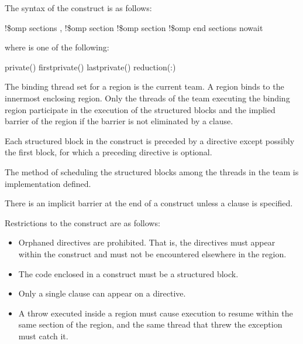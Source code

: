 \begin{samepage}
\fortranspecificstart
The syntax of the  construct is as follows:

\begin{boxedcode}
!\$omp sections \plc{[clause[ [},\plc{] clause] ... ]}
   \plc{[}!\$omp section\plc{]}
   \plc{[}!\$omp section
      \plc{structured-block]}
!\$omp end sections \plc{[}nowait\plc{]}
\end{boxedcode}
\end{samepage}

\begin{samepage}
where  is one of the following:

\begin{indentedcodelist}
private()
firstprivate()
lastprivate()
reduction(:)
\end{indentedcodelist}
\fortranspecificend
\end{samepage}

\binding
The binding thread set for a  region is the current team. A  
region binds to the innermost enclosing  region. Only the threads of the team 
executing the binding  region participate in the execution of the structured 
blocks and the implied barrier of the  region if the barrier is not eliminated 
by a  clause.

\descr
Each structured block in the  construct is preceded by a  directive 
except possibly the first block, for which a preceding  directive is optional.

The method of scheduling the structured blocks among the threads in the team is 
implementation defined.

There is an implicit barrier at the end of a  construct unless a  
clause is specified.

\restrictions
Restrictions to the  construct are as follows:

\begin{itemize}
\item Orphaned  directives are prohibited. That is, the  directives must 
appear within the  construct and must not be encountered elsewhere in the 
 region.

\item The code enclosed in a  construct must be a structured block. 

\item Only a single  clause can appear on a  directive.

\cppspecificstart
\item A throw executed inside a  region must cause execution to resume within 
the same section of the  region, and the same thread that threw the 
exception must catch it.
\cppspecificend
\end{itemize}

